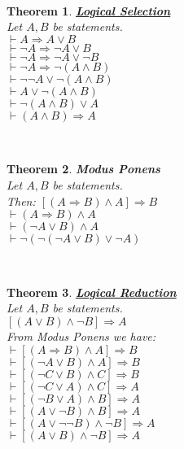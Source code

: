 \documentclass[12pt]{extarticle}
\theoremstyle{plain}
\newtheorem{thm}{Theorem}[section]
\theoremstyle{plain}
\theoremstyle{plain}
\theoremstyle{Definition}
\theoremstyle{Definition}
\theoremstyle{plain}
\theoremstyle{plain}
\newcommand{\cut}[0]{\noindent\framebox[\linewidth]{\rule{\linewidth}{2pt}}\\}
\newcommand{\ddash}{\boxed{\vdash} }
\begin{document}
\cut 
\begin{thm} \underline{\textbf{Logical Selection}} \\
	Let $A,B$ be statements. \\ 
	$\vdash A \Rightarrow A \lor B$ \\ 
	$\vdash \lnot A \Rightarrow \lnot A \lor B$ \\ 
	$\vdash \lnot A \Rightarrow \lnot A \lor \lnot B$ \\ 
	$\vdash \lnot A \Rightarrow \lnot(A \land B)$ \\ 
	$\vdash \lnot \lnot A \lor \lnot (A \land B)$ \\
	$\vdash A \lor \lnot (A \land B)$ \\
	$\vdash \lnot (A \land B) \lor A$ \\
	$\vdash (A \land B) \Rightarrow A$ 
\end{thm}
\cut
\begin{thm} \textbf{Modus Ponens} \\
	Let $A,B$ be statements. \\ 
	Then: $[(A \Rightarrow B) \wedge A] \Rightarrow B$ \\
	$\ddash (A \Rightarrow B) \wedge A$ \\ 
	$\ddash (\lnot A \lor B) \wedge A$ \\ 
	$\ddash \lnot (\lnot (\lnot A \lor B) \lor \lnot A)$ \\
\end{thm}
\cut
\begin{thm} \underline{\textbf{Logical Reduction}} \\ 
	Let $A,B$ be statements. \\ 
	$[(A \lor B)  \land \lnot B] \Rightarrow A$ \\
	From Modus Ponens we have: \\ 
	$\vdash [(A \Rightarrow B) \wedge A] \Rightarrow B$ \\
	$\vdash [(\lnot A \lor B) \wedge A] \Rightarrow B$ \\ 
	$\vdash [(\lnot C \lor B) \wedge C] \Rightarrow B$ \\ 	
	$\vdash [(\lnot C \lor A) \wedge C] \Rightarrow A$ \\ 	
	$\vdash [(\lnot B \lor A) \wedge B] \Rightarrow A$ \\ 	
	$\vdash [(A \lor \lnot B ) \wedge B] \Rightarrow A$ \\
	$\vdash [(A \lor \lnot \lnot B ) \wedge \lnot B] \Rightarrow A$ \\
	$\vdash [(A \lor B ) \wedge \lnot B] \Rightarrow A$ \\
\end{thm}
\end{document}
